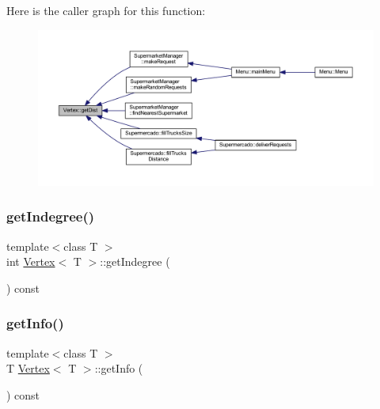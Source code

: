 Here is the caller graph for this function\+:
\nopagebreak
\begin{figure}[H]
\begin{center}
\leavevmode
\includegraphics[width=350pt]{class_vertex_a74863c211c94a7a5d90e565318d1434d_icgraph}
\end{center}
\end{figure}
\mbox{\label{class_vertex_ac78980191ea1f9d22e6617e9e511b755}} 
\subsubsection{\texorpdfstring{get\+Indegree()}{getIndegree()}}
{\footnotesize\ttfamily template$<$class T $>$ \\
int \hyperlink{class_vertex}{Vertex}$<$ T $>$\+::get\+Indegree (\begin{DoxyParamCaption}{ }\end{DoxyParamCaption}) const}

\mbox{\label{class_vertex_a48eae2f7af2362634adab02b7b2dbec6}} 
\subsubsection{\texorpdfstring{get\+Info()}{getInfo()}}
{\footnotesize\ttfamily template$<$class T $>$ \\
T \hyperlink{class_vertex}{Vertex}$<$ T $>$\+::get\+Info (\begin{DoxyParamCaption}{ }\end{DoxyParamCaption}) const}

